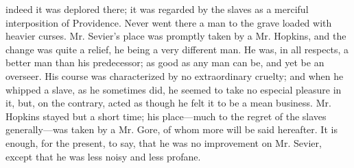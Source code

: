 indeed it was deplored there; it was regarded by the slaves as a
merciful interposition of Providence. Never went there a man to the
grave loaded with heavier curses. Mr. Sevier's place was promptly taken
by a Mr. Hopkins, and the change was quite a relief, he being a very
different man. He was, in all respects, a better man than his
predecessor; as good as any man can be, and yet be an overseer. His
course was characterized by no extraordinary cruelty; and when he
whipped a slave, as he sometimes did, he seemed to take no especial
pleasure in it, but, on the contrary, acted as though he felt it to be a
mean business. Mr. Hopkins stayed but a short time; his place---much to
the regret of the slaves generally---was taken by a Mr. Gore, of whom
more will be said hereafter. It is enough, for the present, to say, that
he was no improvement on Mr. Sevier, except that he was less noisy and
less profane.

